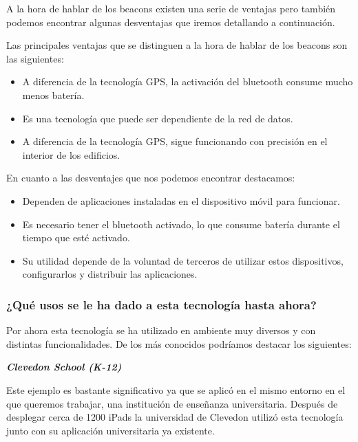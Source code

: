 A la hora de hablar de los beacons existen una serie de ventajas pero también podemos encontrar algunas desventajas que iremos detallando a continuación. 

Las principales ventajas que se distinguen a la hora de hablar de los beacons son las siguientes: 

\begin{itemize}
\item A diferencia de la tecnología GPS, la activación del bluetooth consume mucho menos batería. 
\item Es una tecnología que puede ser dependiente de la red de datos. 
\item A diferencia de la tecnología GPS, sigue funcionando con precisión en el interior de los edificios.
\end{itemize}

En cuanto a las desventajes que nos podemos encontrar destacamos:

\begin{itemize}
\item Dependen de aplicaciones instaladas en el dispositivo móvil para funcionar. 
\item Es necesario tener el bluetooth activado, lo que consume batería durante el tiempo que esté activado. 
\item Su utilidad depende de la voluntad de terceros de utilizar estos dispositivos, configurarlos y distribuir las aplicaciones.
\end{itemize}

\subsubsection{¿Qué usos se le ha dado a esta tecnología hasta ahora?}

Por ahora esta tecnología se ha utilizado en ambiente muy diversos y con distintas funcionalidades. De los más conocidos podríamos destacar los siguientes: 

\vspace{5mm}

\textsl{\textbf{{Clevedon School (K-12)}}}

\vspace{2mm}

Este ejemplo es bastante significativo ya que se aplicó en el mismo entorno en el que queremos trabajar, una institución de enseñanza universitaria. Después de desplegar cerca de 1200 iPads  la universidad de Clevedon utilizó esta tecnología junto con su aplicación universitaria ya existente. 

